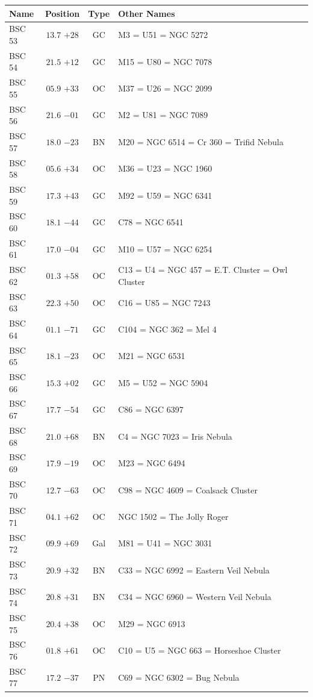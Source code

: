 \begin{table}[t]
    \setlength{\tabcolsep}{2pt}
    \footnotesize
    \begin{tabularx}{\linewidth}{lccX}
        \hline
        Name&Position&Type&Other Names\\
        \hline

BSC 53 &$13.7$ $+28$&GC &M3 = U51 = NGC 5272\\
BSC 54 &$21.5$ $+12$&GC &M15 = U80 = NGC 7078\\
BSC 55 &$05.9$ $+33$&OC &M37 = U26 = NGC 2099\\
BSC 56 &$21.6$ $-01$&GC &M2 = U81 = NGC 7089\\
BSC 57 &$18.0$ $-23$&BN &M20 = NGC 6514 = Cr 360 = Trifid Nebula\\
BSC 58 &$05.6$ $+34$&OC &M36 = U23 = NGC 1960\\
BSC 59 &$17.3$ $+43$&GC &M92 = U59 = NGC 6341\\
BSC 60 &$18.1$ $-44$&GC &C78 = NGC 6541\\
BSC 61 &$17.0$ $-04$&GC &M10 = U57 = NGC 6254\\
BSC 62 &$01.3$ $+58$&OC &C13 = U4 = NGC 457 = E.T. Cluster = Owl Cluster\\
BSC 63 &$22.3$ $+50$&OC &C16 = U85 = NGC 7243\\
BSC 64 &$01.1$ $-71$&GC &C104 = NGC 362 = Mel 4\\
BSC 65 &$18.1$ $-23$&OC &M21 = NGC 6531\\
BSC 66 &$15.3$ $+02$&GC &M5 = U52 = NGC 5904\\
BSC 67 &$17.7$ $-54$&GC &C86 = NGC 6397\\
BSC 68 &$21.0$ $+68$&BN &C4 = NGC 7023 = Iris Nebula\\
BSC 69 &$17.9$ $-19$&OC &M23 = NGC 6494\\
BSC 70 &$12.7$ $-63$&OC &C98 = NGC 4609 = Coalsack Cluster\\
BSC 71 &$04.1$ $+62$&OC &NGC 1502 = The Jolly Roger\\
BSC 72 &$09.9$ $+69$&Gal&M81 = U41 = NGC 3031\\
BSC 73 &$20.9$ $+32$&BN &C33 = NGC 6992 = Eastern Veil Nebula\\
BSC 74 &$20.8$ $+31$&BN &C34 = NGC 6960 = Western Veil Nebula\\
BSC 75 &$20.4$ $+38$&OC &M29 = NGC 6913\\
BSC 76 &$01.8$ $+61$&OC &C10 = U5 = NGC 663 = Horseshoe Cluster\\
BSC 77 &$17.2$ $-37$&PN &C69 = NGC 6302 = Bug Nebula\\

\end{tabularx}
\end{table}
